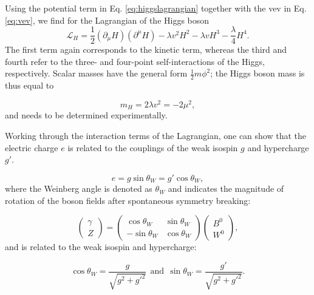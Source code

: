 \noindent Using the potential term in Eq. \ref{eq:higgslagrangian} together with the vev in Eq. \ref{eq:vev}, we find for the Lagrangian of the Higgs boson
\begin{equation}
\mathcal{L}_H = \frac{1}{2}\left(\partial_\mu H\right)\left(\partial^\mu H\right) - \lambda v^2 H^2 - \lambda v H^3 - \frac{\lambda}{4}H^4.
\end{equation}
The first term again corresponds to the kinetic term, whereas the third and fourth refer to the three- and four-point self-interactions of the Higgs, respectively. Scalar masses have the general form $\frac{1}{2}m\phi^2$; the Higgs boson mass is thus equal to 

\begin{equation}
m_H = 2\lambda v^2 = - 2\mu^2,
\end{equation}
and needs to be determined experimentally.

Working through the interaction terms of the Lagrangian, one can show that the electric charge $e$  is related to the couplings of the weak isospin $g$ and hypercharge $g'$.

\begin{equation}
\label{eq:weinbergangle}
e = g \sin \theta_{W} = g' \cos \theta_W,
\end{equation} 
where the Weinberg angle is denoted as $\theta_W$ and indicates the magnitude of rotation of the boson fields after spontaneous symmetry breaking:

\begin{equation}
\begin{pmatrix} \gamma \\ Z \end{pmatrix} = 
\begin{pmatrix} \cos{\theta_W} & \sin{\theta_W} \\ -\sin{\theta_W} & \cos{\theta_W} \end{pmatrix} \begin{pmatrix} B^0 \\ W^0 \end{pmatrix},
\end{equation}
and is related to the weak isospin and hypercharge:

\begin{equation}
\cos \theta_W = \frac{g}{\sqrt{g^2 + g'^2}} \ \ \textrm{and} \ \ \sin \theta_W = \frac{g'}{\sqrt{g^2 + g'^2}}.
\end{equation}




